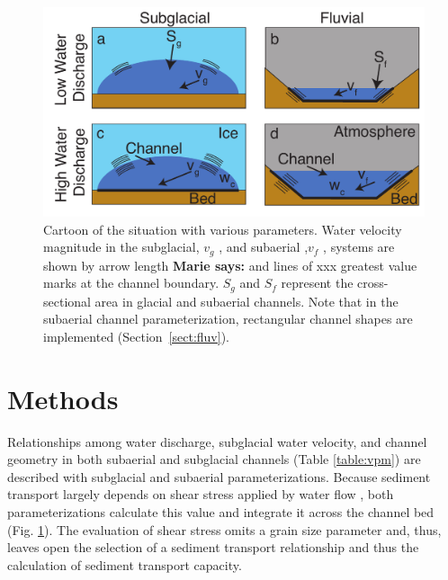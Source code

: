 \documentclass[11pt]{article}
\newcommand{\marie}[1]{{\textbf{\color{green}Marie says:} \color{green} #1} }
\begin{document}
\begin{spacing}{1}
  \begin{center}
    \begin{figure}[H]
      \includegraphics[width=0.65\linewidth]{Cartoon.pdf}
      \caption{Cartoon of the situation with various parameters. Water velocity magnitude in the subglacial, $v_g$ , and subaerial ,$v_f$ , systems are shown by arrow length \marie{and lines of xxx greatest value} marks at the channel boundary. $S_g$ and $S_f$ represent the cross-sectional area in glacial and subaerial channels. Note that in the subaerial channel parameterization, rectangular channel shapes are implemented (Section~\ref{sect:fluv}).} 
      \label{fig:cartoon}
    \end{figure}
  \end{center}


  
  \section{Methods}
  \label{sect:meth}
 Relationships among water discharge, subglacial water velocity, and channel geometry in both subaerial and subglacial channels (Table \ref{table:vpm}) are described with subglacial and subaerial parameterizations.
  Because sediment transport largely depends on shear stress applied by water flow \citep{shields1936}, both parameterizations calculate this value and integrate  it across the channel bed (Fig. \ref{fig:cartoon}).
  The evaluation of shear stress  omits a grain size parameter and, thus, leaves open the selection of a sediment transport relationship  \citep{shields1936} and thus the calculation of sediment transport capacity.


\end{spacing}
\end{document}
